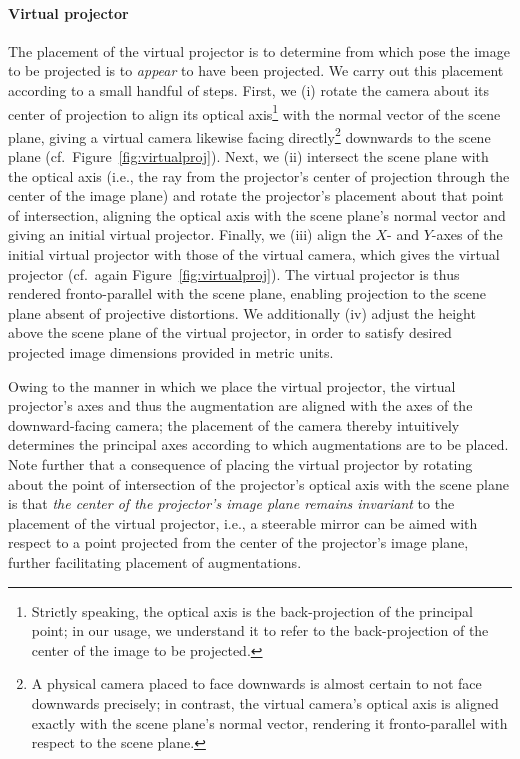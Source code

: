 \documentclass[review]{elsarticle}
\begin{document}
{\paragraph{Virtual projector} The placement of the virtual projector is to determine from which pose the image to be projected is to \textit{appear} to have been projected. We carry out this placement according to a small handful of steps. First, we (i) rotate the camera about its center of projection to align its optical axis\footnote{Strictly speaking, the optical axis is the back-projection of the principal point; in our usage, we understand it to refer to the back-projection of the center of the image to be projected.} with the normal vector of the scene plane, giving a virtual camera likewise facing directly\footnote{A physical camera placed to face downwards is almost certain to not face downwards precisely; in contrast, the virtual camera's optical axis is aligned exactly with the scene plane's normal vector, rendering it fronto-parallel with respect to the scene plane.} downwards to the scene plane (cf.\ Figure~\ref{fig:virtualproj}). Next, we (ii) intersect the scene plane with the optical axis (i.e., the ray from the projector's center of projection through the center of the image plane) and rotate the projector's placement about that point of intersection, aligning the optical axis with the scene plane's normal vector and giving an initial virtual projector. Finally, we (iii) align the $X$- and $Y$-axes of the initial virtual projector with those of the virtual camera, which gives the virtual projector (cf.\ again Figure~\ref{fig:virtualproj}). The virtual projector is thus rendered fronto-parallel with the scene plane, enabling projection to the scene plane absent of projective distortions. We additionally (iv) adjust the height above the scene plane of the virtual projector, in order to satisfy desired projected image dimensions provided in metric units.

Owing to the manner in which we place the virtual projector, the virtual projector's axes and thus the augmentation are aligned with the axes of the downward-facing camera; the placement of the camera thereby intuitively determines the principal axes according to which augmentations are to be placed. Note further that a consequence of placing the virtual projector by rotating about the point of intersection of the projector's optical axis with the scene plane is that \textit{the center of the projector's image plane remains invariant} to the placement of the virtual projector, i.e., a steerable mirror can be aimed with respect to a point projected from the center of the projector's image plane, further facilitating placement of augmentations.

}
\end{document}
